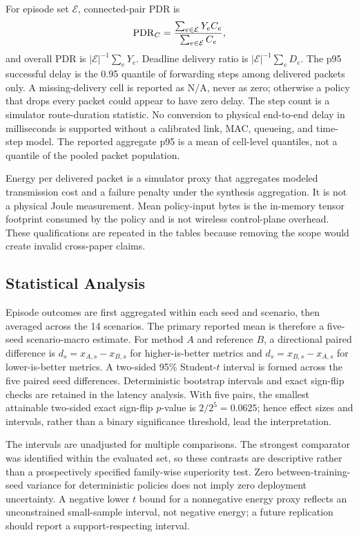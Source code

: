 \documentclass[drones,article,submit,moreauthors]{Definitions/mdpi}
\begin{document}
For episode set $\mathcal E$, connected-pair PDR is
\begin{equation}
\mathrm{PDR}_C=\frac{\sum_{e\in\mathcal E}Y_e C_e}{\sum_{e\in\mathcal E}C_e},
\end{equation}
and overall PDR is $|\mathcal E|^{-1}\sum_e Y_e$. Deadline delivery ratio is $|\mathcal E|^{-1}\sum_e D_e$. The p95 successful delay is the 0.95 quantile of forwarding steps among delivered packets only. A missing-delivery cell is reported as N/A, never as zero; otherwise a policy that drops every packet could appear to have zero delay. The step count is a simulator route-duration statistic. No conversion to physical end-to-end delay in milliseconds is supported without a calibrated link, MAC, queueing, and time-step model. The reported aggregate p95 is a mean of cell-level quantiles, not a quantile of the pooled packet population.

Energy per delivered packet is a simulator proxy that aggregates modeled transmission cost and a failure penalty under the synthesis aggregation. It is not a physical Joule measurement. Mean policy-input bytes is the in-memory tensor footprint consumed by the policy and is not wireless control-plane overhead. These qualifications are repeated in the tables because removing the scope would create invalid cross-paper claims.

\subsection{Statistical Analysis}

Episode outcomes are first aggregated within each seed and scenario, then averaged across the 14 scenarios. The primary reported mean is therefore a five-seed scenario-macro estimate. For method $A$ and reference $B$, a directional paired difference is $d_s=x_{A,s}-x_{B,s}$ for higher-is-better metrics and $d_s=x_{B,s}-x_{A,s}$ for lower-is-better metrics. A two-sided 95\% Student-$t$ interval is formed across the five paired seed differences. Deterministic bootstrap intervals and exact sign-flip checks are retained in the latency analysis. With five pairs, the smallest attainable two-sided exact sign-flip $p$-value is $2/2^5=0.0625$; hence effect sizes and intervals, rather than a binary significance threshold, lead the interpretation.

The intervals are unadjusted for multiple comparisons. The strongest comparator was identified within the evaluated set, so these contrasts are descriptive rather than a prospectively specified family-wise superiority test. Zero between-training-seed variance for deterministic policies does not imply zero deployment uncertainty. A negative lower $t$ bound for a nonnegative energy proxy reflects an unconstrained small-sample interval, not negative energy; a future replication should report a support-respecting interval.
\end{document}
